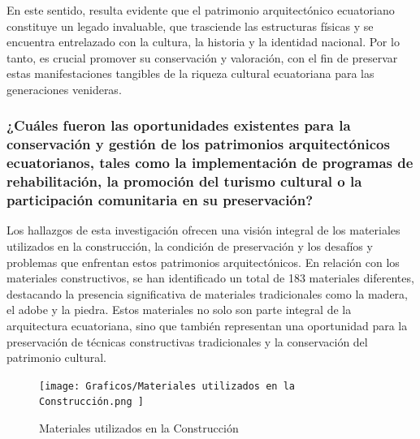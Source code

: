 \documentclass[journal,article,submit,pdftex,moreauthors]{Definitions/mdpi}
\begin{document}
En este sentido, resulta evidente que el patrimonio arquitectónico ecuatoriano constituye un legado invaluable, que trasciende las estructuras físicas y se encuentra entrelazado con la cultura, la historia y la identidad nacional. Por lo tanto, es crucial promover su conservación y valoración, con el fin de preservar estas manifestaciones tangibles de la riqueza cultural ecuatoriana para las generaciones venideras.
 \par %
\subsubsection{\textbf{¿Cuáles fueron las oportunidades existentes para la conservación y gestión de los patrimonios arquitectónicos ecuatorianos, tales como la implementación de programas de rehabilitación, la promoción del turismo cultural o la participación comunitaria en su preservación?}}\par %
Los hallazgos de esta investigación ofrecen una visión integral de los materiales utilizados en la construcción, la condición de preservación y los desafíos y problemas que enfrentan estos patrimonios arquitectónicos. En relación con los materiales constructivos, se han identificado un total de 183 materiales diferentes, destacando la presencia significativa de materiales tradicionales como la madera, el adobe y la piedra. Estos materiales no solo son parte integral de la arquitectura ecuatoriana, sino que también representan una oportunidad para la preservación de técnicas constructivas tradicionales y la conservación del patrimonio cultural.
 \par %
  \begin{figure} [h!]
    \centering
    \texttt{[image: Graficos/Materiales utilizados en la Construcción.png ]}
    \caption{Materiales utilizados en la Construcción}
    \label{fig:grafico}
\end{figure}
 
\end{document}
